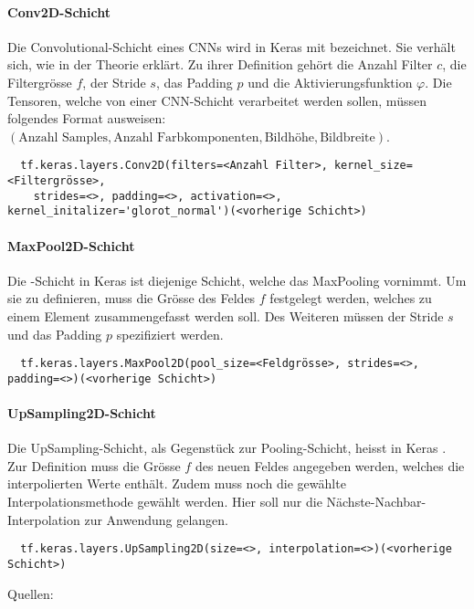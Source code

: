 \paragraph{Conv2D-Schicht}
Die Convolutional-Schicht eines CNNs wird in Keras mit 
bezeichnet. Sie verhält sich, wie in der Theorie erklärt. Zu ihrer Definition
gehört die Anzahl Filter $c$, die Filtergrösse $f$, der Stride $s$, das Padding
$p$ und die Aktivierungsfunktion $\varphi$.
Die Tensoren, welche von einer CNN-Schicht verarbeitet werden sollen, müssen
folgendes Format ausweisen: $(\text{Anzahl Samples}, \text{Anzahl
  Farbkomponenten}, \text{Bildhöhe}, \text{Bildbreite})$.
\begin{verbatim}
  tf.keras.layers.Conv2D(filters=<Anzahl Filter>, kernel_size=<Filtergrösse>,
    strides=<>, padding=<>, activation=<>, kernel_initalizer='glorot_normal')(<vorherige Schicht>)
\end{verbatim}

\paragraph{MaxPool2D-Schicht}
Die -Schicht in Keras ist diejenige Schicht, welche das MaxPooling vornimmt. Um sie zu
definieren, muss die Grösse des Feldes $f$ festgelegt werden, welches zu einem Element
zusammengefasst werden soll. Des Weiteren müssen der Stride $s$ und das Padding $p$
spezifiziert werden.

\begin{verbatim}
  tf.keras.layers.MaxPool2D(pool_size=<Feldgrösse>, strides=<>, padding=<>)(<vorherige Schicht>)
\end{verbatim}

\paragraph{UpSampling2D-Schicht}
Die UpSampling-Schicht, als Gegenstück zur Pooling-Schicht, heisst in Keras
. Zur Definition muss die Grösse $f$ des neuen Feldes
angegeben werden, welches die interpolierten Werte enthält.
Zudem muss noch die gewählte Interpolationsmethode gewählt werden. Hier soll nur
die Nächste-Nachbar-Interpolation zur Anwendung gelangen.

\begin{verbatim}
  tf.keras.layers.UpSampling2D(size=<>, interpolation=<>)(<vorherige Schicht>)
\end{verbatim}
\para{}
Quellen: \cite{net:keras_docs} \cite{net:tf_docs}

